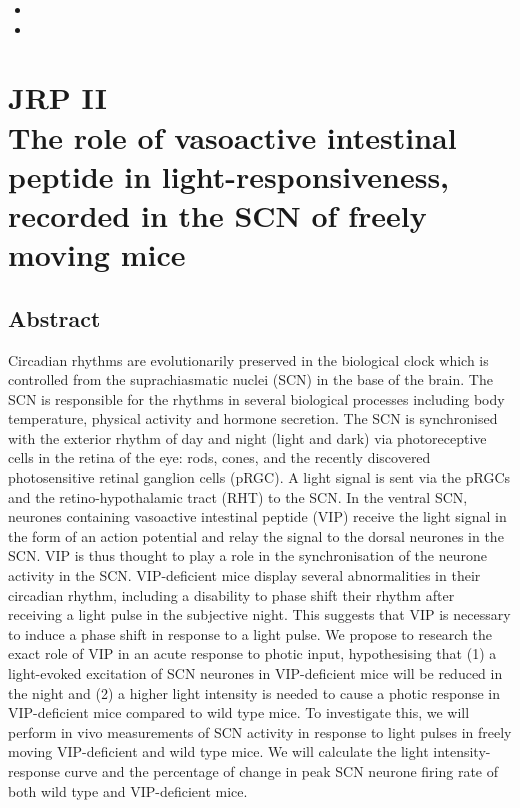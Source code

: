 
\begin{itemize}
  \item 
  \item
\end{itemize}



\chapter{JRP II\\ The role of vasoactive intestinal peptide in light-responsiveness, recorded in the SCN of freely moving mice}


%

 \section{Abstract}
Circadian rhythms are evolutionarily preserved in the biological clock which is controlled from the suprachiasmatic nuclei (SCN) in the base of the brain. The SCN is responsible for the rhythms in several biological processes including body temperature, physical activity and hormone secretion. The SCN is synchronised with the exterior rhythm of day and night (light and dark) via photoreceptive cells in the retina of the eye: rods, cones, and the recently discovered photosensitive retinal ganglion cells (pRGC). A light signal is sent via the pRGCs and the retino-hypothalamic tract (RHT) to the SCN. In the ventral SCN, neurones containing vasoactive intestinal peptide (VIP) receive the light signal in the form of an action potential and relay the signal to the dorsal neurones in the SCN. VIP is thus thought to play a role in the synchronisation of the neurone activity in the SCN. VIP-deficient mice display several abnormalities in their circadian rhythm, including a disability to phase shift their rhythm after receiving a light pulse in the subjective night. This suggests that VIP is necessary to induce a phase shift in response to a light pulse. We propose to research the exact role of VIP in an acute response to photic input, hypothesising that (1) a light-evoked excitation of SCN neurones in VIP-deficient mice will be reduced in the night and (2) a higher light intensity is needed to cause a photic response in VIP-deficient mice compared to wild type mice. To investigate this, we will perform in vivo measurements of SCN activity in response to light pulses in freely moving VIP-deficient and wild type mice. We will calculate the light intensity-response curve and the percentage of change in peak SCN neurone firing rate of both wild type and VIP-deficient mice.

